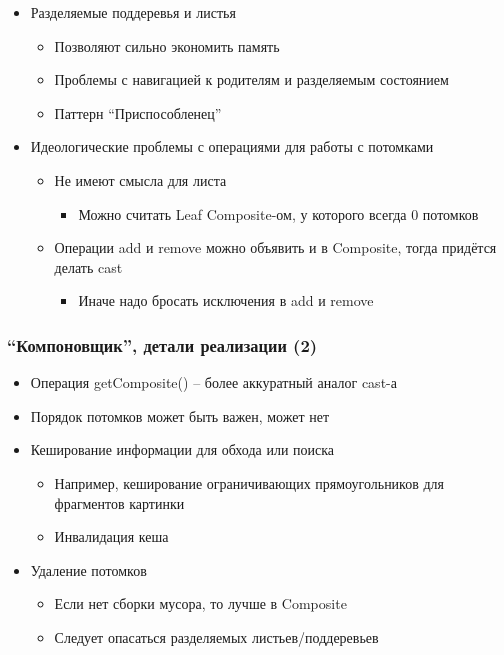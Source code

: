 \documentclass[xetex,mathserif,serif]{beamer}
\begin{document}
\begin{frame}
        \begin{itemize}
            \item Разделяемые поддеревья и листья
            \begin{itemize}
                \item Позволяют сильно экономить память
                \item Проблемы с навигацией к родителям и разделяемым состоянием
                \item Паттерн ``Приспособленец''
            \end{itemize}
            \item Идеологические проблемы с операциями для работы с потомками
            \begin{itemize}
                \item Не имеют смысла для листа
                \begin{itemize}
                    \item Можно считать Leaf Composite-ом, у которого всегда 0 потомков
                \end{itemize}
                \item Операции add и remove можно объявить и в Composite, тогда придётся делать cast
                \begin{itemize}
                    \item Иначе надо бросать исключения в add и remove
                \end{itemize}
            \end{itemize}
        \end{itemize}
    \end{frame}

    \begin{frame}
        \frametitle{``Компоновщик'', детали реализации (2)}
        \begin{itemize}
            \item Операция getComposite() – более аккуратный аналог cast-а
            \item Порядок потомков может быть важен, может нет
            \item Кеширование информации для обхода или поиска
            \begin{itemize}
                \item Например, кеширование ограничивающих прямоугольников для фрагментов картинки
                \item Инвалидация кеша
            \end{itemize}
            \item Удаление потомков
            \begin{itemize}
                \item Если нет сборки мусора, то лучше в Composite
                \item Следует опасаться разделяемых листьев/поддеревьев
            \end{itemize}
        \end{itemize}
    \end{frame}
\end{document}
